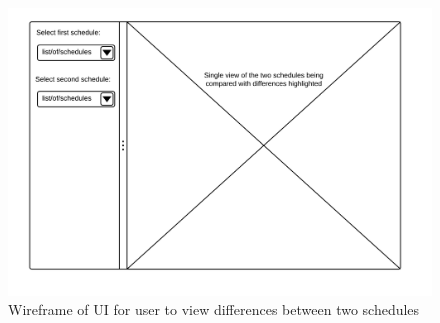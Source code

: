 \documentclass{extarticle}
\begin{document}
\begin{appendices}
\begin{figure}[!ht]
    \centering
    \includegraphics[width=1.0\textwidth]{img/compare_page_wireframe}
    \caption{Wireframe of UI for user to view differences between two schedules}
    \label{fig:compare_page_wireframe}
\end{figure}
\end{appendices}
\end{document}
